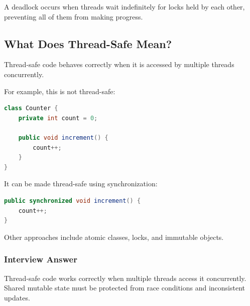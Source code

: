 \documentclass[12pt,a4paper]{article}
\begin{document}
A deadlock occurs when threads wait indefinitely for locks held by each
other, preventing all of them from making progress.

\subsection{What Does Thread-Safe Mean?}

Thread-safe code behaves correctly when it is accessed by multiple threads
concurrently.

For example, this is not thread-safe:

\begin{lstlisting}[language=Java]
class Counter {
    private int count = 0;

    public void increment() {
        count++;
    }
}
\end{lstlisting}

It can be made thread-safe using synchronization:

\begin{lstlisting}[language=Java]
public synchronized void increment() {
    count++;
}
\end{lstlisting}

Other approaches include atomic classes, locks, and immutable objects.

\subsubsection*{Interview Answer}

Thread-safe code works correctly when multiple threads access it
concurrently. Shared mutable state must be protected from race conditions
and inconsistent updates.
\end{document}

